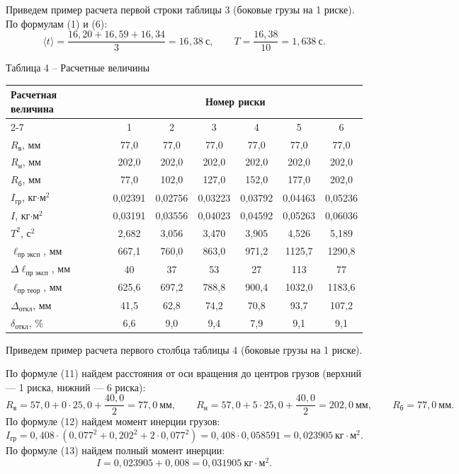 \documentclass[11pt,a4paper]{article}
\newcommand{\sub}[1]{\text{#1}}
\begin{document}
Приведем пример расчета первой строки таблицы 3 (боковые грузы на 1 риске).
По формулам (1) и (6):
\[
\langle t\rangle=\frac{16,20+16,59+16,34}{3}=16,38\ \text{с},\qquad T=\frac{16,38}{10}=1,638\ \text{с}.
\]

\begin{center}
Таблица 4 – Расчетные величины\\[3pt]
\small
\begin{tabular}{|l|c|c|c|c|c|c|}
\hline
\multirow{2}{*}{Расчетная величина} & \multicolumn{6}{c|}{Номер риски}\\\cline{2-7}
 & 1 & 2 & 3 & 4 & 5 & 6\\\hline
$R_\sub{в}$, мм & 77,0 & 77,0 & 77,0 & 77,0 & 77,0 & 77,0\\\hline
$R_\sub{н}$, мм & 202,0 & 202,0 & 202,0 & 202,0 & 202,0 & 202,0\\\hline
$R_\sub{б}$, мм & 77,0 & 102,0 & 127,0 & 152,0 & 177,0 & 202,0\\\hline
$I_\sub{гр}$, кг$\cdot$м$^2$ & 0,02391 & 0,02756 & 0,03223 & 0,03792 & 0,04463 & 0,05236\\\hline
$I$, кг$\cdot$м$^2$ & 0,03191 & 0,03556 & 0,04023 & 0,04592 & 0,05263 & 0,06036\\\hline
$T^2$, с$^2$ & 2,682 & 3,056 & 3,470 & 3,905 & 4,526 & 5,189\\\hline
$\ell_\sub{пр эксп}$, мм & 667,1 & 760,0 & 863,0 & 971,2 & 1125,7 & 1290,8\\\hline
$\Delta\ell_\sub{пр эксп}$, мм & 40 & 37 & 53 & 27 & 113 & 77\\\hline
$\ell_\sub{пр теор}$, мм & 625,6 & 697,2 & 788,8 & 900,4 & 1032,0 & 1183,6\\\hline
$\Delta_\sub{откл}$, мм & 41,5 & 62,8 & 74,2 & 70,8 & 93,7 & 107,2\\\hline
$\delta_\sub{откл}$, \% & 6,6 & 9,0 & 9,4 & 7,9 & 9,1 & 9,1\\\hline
\end{tabular}
\end{center}

Приведем пример расчета первого столбца таблицы 4 (боковые грузы на 1 риске).

По формуле (11) найдем расстояния от оси вращения до центров грузов (верхний — 1 риска, нижний — 6 риска):
\[
R_\sub{в}=57,0+0\cdot25,0+\frac{40,0}{2}=77,0\ \text{мм},\qquad
R_\sub{н}=57,0+5\cdot25,0+\frac{40,0}{2}=202,0\ \text{мм},\qquad
R_\sub{б}=77,0\ \text{мм}.
\]
По формуле (12) найдем момент инерции грузов:
\[
I_\sub{гр}=0,408\cdot\left(0,077^2+0,202^2+2\cdot0,077^2\right)=0,408\cdot0,058591=0,023905\ \text{кг}\cdot\text{м}^2.
\]
По формуле (13) найдем полный момент инерции:
\[
I=0,023905+0,008=0,031905\ \text{кг}\cdot\text{м}^2.
\]
\end{document}
